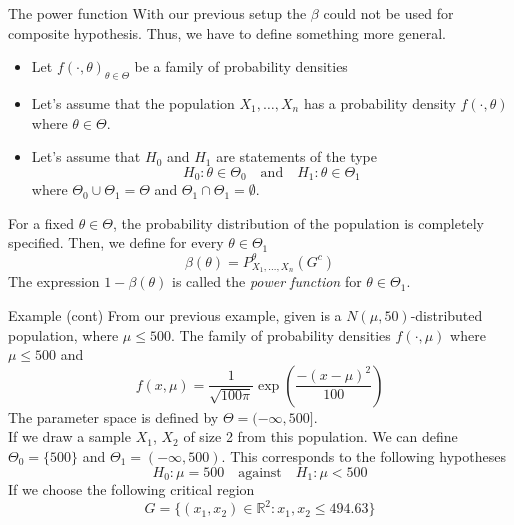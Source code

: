 \documentclass{beamer}
\begin{document}
\begin{frame}{The power function}
	With our previous setup the $\beta$ could not be used for composite hypothesis. Thus, we have to define something more general. 
	\begin{itemize}
		\item Let $f(\cdot, \theta)_{\theta \in \Theta}$ be a family of probability densities 
		\item Let's assume that the population $X_1,\ldots, X_n$  has a probability density $f(\cdot,\theta)$ where $\theta \in \Theta$.  
		\item Let's assume that $H_0$ and $H_1$ are statements of the type
		\begin{equation*}
			H_0 \colon \theta \in \Theta_0 \quad \text{and} \quad H_1\colon \theta \in \Theta_1
		\end{equation*}
	where $\Theta_0 \cup \Theta_1= \Theta$ and $\Theta_1 \cap \Theta_1= \emptyset$.
	
	\end{itemize}
	For a fixed $\theta \in \Theta$, the probability distribution of the population is completely specified. Then, we define for every $\theta \in \Theta_1$
	\begin{equation*}
		\beta(\theta)= P_{X_1,\ldots, X_n}^\theta (G^c)
	\end{equation*}
	The expression $1-\beta(\theta)$ is called the \textit{power function} for $\theta \in \Theta_1$.
\end{frame}

\begin{frame}{Example (cont)}
	From our previous example, given is a $N(\mu, 50)$-distributed population, where $\mu \le 500$. 
	The family of probability densities $f(\cdot, \mu)$ where $\mu\le 500$ and 
	\begin{equation*}
		f(x,\mu)= \frac{1}{\sqrt{100 \pi}} \exp(\frac{-(x-\mu)^2}{100})
	\end{equation*}
	The parameter space is defined by $\Theta=(-\infty, 500]$. \\
	If we draw a sample $X_1$, $X_2$ of size 2 from this population. We can define $\Theta_0=\{500\}$ and $\Theta_1= (-\infty, 500)$. This corresponds to the following hypotheses
	\begin{equation*}
		H_0 \colon \mu = 500 \quad \text{against} \quad H_1 \colon \mu< 500
	\end{equation*}
If we choose the following critical region 
\begin{equation*}
	G= \{ (x_1,x_2)\in \mathbb{R}^2: x_1, x_2 \le 494.63 \}
\end{equation*}

	
\end{frame}
\end{document}
